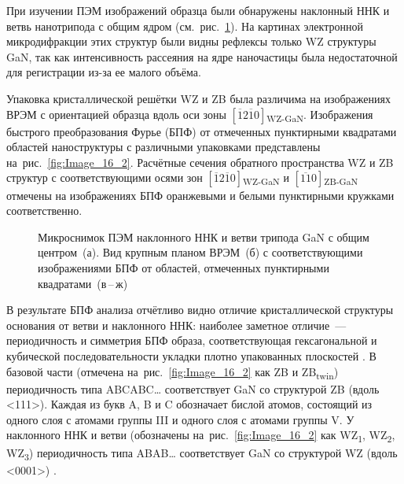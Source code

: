При изучении ПЭМ изображений образца были обнаружены наклонный ННК и ветвь
нанотрипода с общим ядром (см.~рис.~\cref{fig:Image_16}). На картинах
электронной микродифракции этих структур были видны рефлексы только WZ
структуры GaN, так как интенсивность рассеяния на ядре наночастицы была
недостаточной для регистрации из-за ее малого объёма.

Упаковка кристаллической решётки WZ и ZB была различима на изображениях ВРЭМ с
ориентацией образца вдоль оси зоны
\([\overline{1}2\overline{1}0]\)\textsubscript{WZ-GaN}. Изображения быстрого
преобразования Фурье (БПФ) от отмеченных пунктирными квадратами областей
наноструктуры с различными упаковками представлены
на~рис.~\cref{fig:Image_16_2}. Расчётные сечения обратного пространства WZ и ZB
структур с соответствующими осями зон
\([\overline{1}2\overline{1}0]\)\textsubscript{WZ-GaN} и
\([\overline{11}0]\)\textsubscript{ZB-GaN} отмечены на изображениях БПФ
оранжевыми и белыми пунктирными кружками соответственно.

\begin{figure}[ht] 
				\caption{Микроснимок ПЭМ наклонного ННК и ветви трипода GaN с общим
					центром~(а). Вид крупным планом ВРЭМ~(б) с соответствующими
			изображениями БПФ от областей, отмеченных пунктирными
	квадратами~(в\,--\,ж)}\label{fig:Image_16} \end{figure}

В результате БПФ анализа отчётливо видно отличие кристаллической структуры
основания от ветви и наклонного ННК: наиболее заметное отличие~---
периодичность и симметрия БПФ образа, соответствующая гексагональной и
кубической последовательности укладки плотно упакованных плоскостей
\cite{Jo2018, Bayram2014, Borysiuk2014}. В базовой части (отмечена
на~рис.~\cref{fig:Image_16_2} как ZB и ZB\textsubscript{twin}) периодичность
типа ABCABC{\dots} соответствует GaN со структурой ZB (вдоль <111>). Каждая из
букв A, B и C обозначает бислой атомов, состоящий из одного слоя с атомами
группы III и одного слоя с атомами группы V. У наклонного ННК и ветви
(обозначены на~рис.~\cref{fig:Image_16_2} как WZ\textsubscript{1},
WZ\textsubscript{2}, WZ\textsubscript{3}) периодичность типа ABAB{\dots}
соответствует GaN со структурой WZ (вдоль <0001>) \cite{Kriegner2011}.

